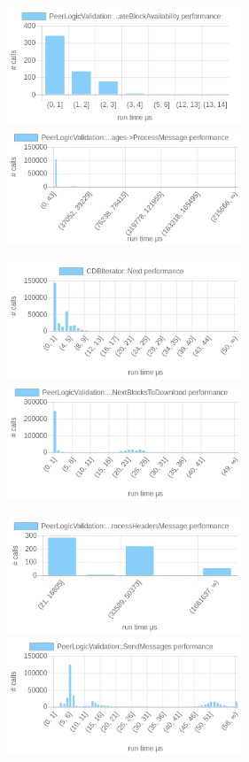 \documentclass{article}
\begin{document}
\begin{table}
	\includegraphics[width=7cm]{images/london/chartPeerLogicValidation_3A_3AProcessMessages-_3EProcessMessage-_3EProcessHeadersMessage-_3EUpdateBlockAvailability.png}
	\includegraphics[width=7cm]{images/london/chartPeerLogicValidation_3A_3AProcessMessages-_3EProcessMessage.png}
	
	\includegraphics[width=7cm]{images/london/chartCDBIterator_3A_3ANext.png}
	\includegraphics[width=7cm]{images/london/chartPeerLogicValidation_3A_3ASendMessages-_3EFindNextBlocksToDownload.png}
	
	\includegraphics[width=7cm]{images/london/chartPeerLogicValidation_3A_3AProcessMessages-_3EProcessMessage-_3EProcessHeadersMessage.png}
	\includegraphics[width=7cm]{images/london/chartPeerLogicValidation_3A_3ASendMessages.png}
	

\end{table}
\end{document}
